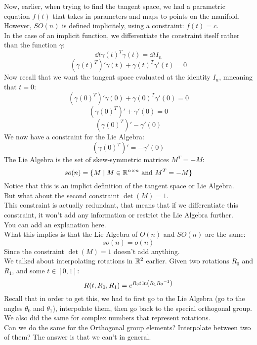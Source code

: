 \documentclass[12pt]{article}
\begin{document}
Now, earlier, when trying to find the
tangent space, we had a parametric
equation $f(t)$ that takes in parameters
and maps to points on the manifold. \\
However, $SO(n)$ is defined implicitely,
using a constraint: $f(t) = c$. \\
In the case of an implicit function,
we differentiate the constraint itself
rather than the function $\gamma$:
\[ \dd{}{t}\gamma(t)^T\gamma(t) = \dd{}{t}I_n \]
\[ (\gamma(t)^T)'\gamma(t)
+ \gamma(t)^T\gamma'(t) = 0 \]
Now recall that we want the tangent space
evaluated at the identity $I_n$,
mneaning that $t = 0$:
\[ (\gamma(0)^T)'\gamma(0)
+ \gamma(0)^T\gamma'(0) = 0  \]
\[ (\gamma(0)^T)' + \gamma'(0) = 0  \]
\[ (\gamma(0)^T)' - \gamma'(0)  \]
We now have a constraint for the Lie Algebra:
\[ (\gamma(0)^T)' = -\gamma'(0)  \]
The Lie Algebra is the set of skew-symmetric
matrices $M^T = -M$:
\[ so(n) = \{M \mid M \in \mathbb{R}^{n \times n}
\text{ and } M^T = -M \} \]
Notice that this is an implict definition
of the tangent space or Lie Algebra. \\

But what about the second constraint $\det(M) = 1$. \\
This constraint is actually redundant,
that means that if we differentiate this constraint,
it won't add any information or restrict the Lie
Algebra further. \\

You can add an explanation here. \\

What this implies is that the Lie Algebra
of $O(n)$ and $SO(n)$ are the same:
\[ so(n) = o(n) \]
Since the constraint $\det(M) = 1$
doesn't add anything. \\

We talked about interpolating
rotations in $\mathbb{R}^2$ earlier.
Given two rotations $R_0$ and $R_1$,
and some $t \in [0, 1]$:
\[ R(t,R_0,R_1) = 
e^{{R_0t\ln\left( {R_1}{R_0}^{-1} \right)}} \]
Recall that in order to get this,
we had to first go to the Lie Algebra
(go to the angles $\theta_0$ and $\theta_1$),
interpolate them,
then go back to the special orthogonal group. \\
We also did the same for complex numbers
that represent rotations. \\

Can we do the same for the Orthogonal
group elements? Interpolate between two of them?
The answer is that we can't in general. \\
\end{document}
